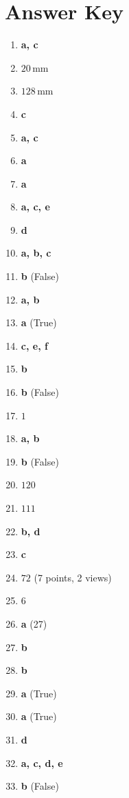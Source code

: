 \documentclass[11pt,oneside]{article}
\begin{document}
\newpage
\section*{Answer Key}

\begin{enumerate}[label=\textbf{Q\arabic*.}, leftmargin=3em, itemsep=4pt]
  \item \textbf{a, c}
  \item $20$\,mm
  \item $128$\,mm
  \item \textbf{c}
  \item \textbf{a, c}
  \item \textbf{a}
  \item \textbf{a}
  \item \textbf{a, c, e}
  \item \textbf{d}
  \item \textbf{a, b, c}
  \item \textbf{b} (False)
  \item \textbf{a, b}
  \item \textbf{a} (True)
  \item \textbf{c, e, f}
  \item \textbf{b}
  \item \textbf{b} (False)
  \item $1$
  \item \textbf{a, b}
  \item \textbf{b} (False)
  \item $120$
  \item $111$
  \item \textbf{b, d}
  \item \textbf{c}
  \item $72$ (7 points, 2 views)
  \item $6$
  \item \textbf{a} (27)
  \item \textbf{b}
  \item \textbf{b}
  \item \textbf{a} (True)
  \item \textbf{a} (True)
  \item \textbf{d}
  \item \textbf{a, c, d, e}
  \item \textbf{b} (False)

\end{enumerate}
\end{document}
